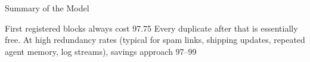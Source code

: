 Summary of the Model

First registered blocks always cost 97.75%
Every duplicate after that is essentially free.
At high redundancy rates (typical for spam links, shipping updates, repeated agent memory, log streams), savings approach 97–99%
